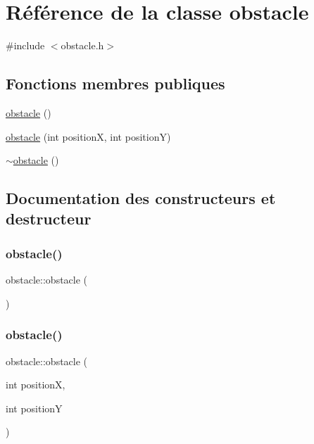 \hypertarget{classobstacle}{}\section{Référence de la classe obstacle}
\label{classobstacle}


{\ttfamily \#include $<$obstacle.\+h$>$}

\subsection*{Fonctions membres publiques}
\begin{DoxyCompactItemize}
\item 
\hyperlink{classobstacle_a35e495dba687ff53be20bfe1ddac57a6}{obstacle} ()
\item 
\hyperlink{classobstacle_a118ec53c956ac8452144d680d267ff9b}{obstacle} (int positionX, int positionY)
\item 
\hyperlink{classobstacle_a80f971014a4e7ff96e5a0ab48f04833a}{$\sim$obstacle} ()
\end{DoxyCompactItemize}


\subsection{Documentation des constructeurs et destructeur}
\mbox{\label{classobstacle_a35e495dba687ff53be20bfe1ddac57a6}} 
\subsubsection{\texorpdfstring{obstacle()}{obstacle()}\hspace{0.1cm}{\footnotesize\ttfamily [1/2]}}
{\footnotesize\ttfamily obstacle\+::obstacle (\begin{DoxyParamCaption}{ }\end{DoxyParamCaption})}

\mbox{\label{classobstacle_a118ec53c956ac8452144d680d267ff9b}} 
\subsubsection{\texorpdfstring{obstacle()}{obstacle()}\hspace{0.1cm}{\footnotesize\ttfamily [2/2]}}
{\footnotesize\ttfamily obstacle\+::obstacle (\begin{DoxyParamCaption}\item[{int}]{positionX,  }\item[{int}]{positionY }\end{DoxyParamCaption})}

